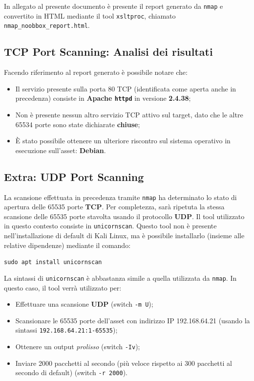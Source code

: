 \documentclass[a4paper, 12pt, oneside]{article}
\begin{document}
In allegato al presente documento è presente il report generato da \texttt{nmap} e convertito in HTML mediante il tool \texttt{xsltproc}, chiamato \texttt{nmap\_noobbox\_report.html}.

\subsection{TCP Port Scanning: Analisi dei risultati}
Facendo riferimento al report generato è possibile notare che:

\begin{itemize}
    \item Il servizio presente sulla porta 80 TCP (identificata come aperta anche in precedenza) consiste in \textbf{Apache \texttt{httpd}} in versione \textbf{2.4.38};
    \item Non è presente nessun altro servizio TCP attivo sul target, dato che le altre 65534 porte sono state dichiarate \textbf{chiuse};
    \item È stato possibile ottenere un ulteriore riscontro sul sistema operativo in esecuzione sull'asset: \textbf{Debian}.
\end{itemize}

\subsection{Extra: UDP Port Scanning}
La scansione effettuata in precedenza tramite \texttt{nmap} ha determinato lo stato di apertura delle 65535 porte \textbf{TCP}. Per completezza, sarà ripetuta la stessa scansione delle 65535 porte stavolta usando il protocollo \textbf{UDP}. Il tool utilizzato in questo contesto consiste in \texttt{unicornscan}. Questo tool non è presente nell'installazione di default di Kali Linux, ma è possibile installarlo (insieme alle relative dipendenze) mediante il comando:

\begin{center}
    \texttt{sudo apt install unicornscan}
\end{center}

La sintassi di \texttt{unicornscan} \cite{unicornscan} è abbastanza simile a quella utilizzata da \texttt{nmap}. In questo caso, il tool verrà utilizzato per:

\begin{itemize}
    \item Effettuare una scansione \textbf{UDP} (switch \texttt{-m U});
    \item Scansionare le 65535 porte dell'asset con indirizzo IP 192.168.64.21 (usando la sintassi \texttt{192.168.64.21:1-65535});
    \item Ottenere un output \textit{prolisso} (switch \texttt{-Iv});
    \item Inviare 2000 pacchetti al secondo (più veloce rispetto ai 300 pacchetti al secondo di default) (switch \texttt{-r 2000}).
\end{itemize}
\end{document}
